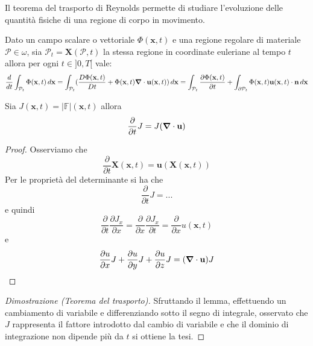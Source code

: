 Il teorema del trasporto di Reynolds permette di studiare l'evoluzione delle quantità fisiche di una regione di corpo in movimento.

\begin{theorem}
Dato un campo scalare o vettoriale $\Phi(\mathbf{x},t)$ e una regione regolare di materiale $\mathcal{P}\in\omega$, sia $\mathcal{P}_{t} = \mathbf{X}(\mathcal{P},t)$ la stessa regione in coordinate euleriane al tempo $t$ allora per ogni $t\in ]0,T[$ vale:
\begin{equation}
\frac{d}{dt}\int_{\mathcal{P}_{t}}\Phi(\mathbf{x},t)\,d\mathbf{x} = \int_{\mathcal{P}_{t}}(\frac{D\Phi(\mathbf{x},t)}{Dt}+\Phi(\mathbf{x},t)\boldsymbol{\nabla}\cdot\mathbf{u}(\mathbf{x},t))\,d\mathbf{x}
= \int_{\mathcal{P}_{t}}\frac{\partial\Phi(\mathbf{x},t)}{\partial t}+ \int_{\partial\mathcal{P}_{t}}\Phi(\mathbf{x},t)\mathbf{u}(\mathbf{x},t)\cdot\mathbf{n}\,d\mathbf{x}
\end{equation}
\end{theorem}
\begin{lemma}
Sia $J(\mathbf{x},t)=|\mathbb{F}|(\mathbf{x},t)$ allora
\begin{equation}
\frac{\partial}{\partial t}J = J (\boldsymbol{\nabla} \cdot \mathbf{u} )
\end{equation}
\end{lemma}
\begin{proof}
Osserviamo che 
\begin{equation}
\frac{\partial}{\partial t}\mathbf{X}(\mathbf{x},t) = \mathbf{u}(\mathbf{X}(\mathbf{x},t))
\end{equation}
Per le proprietà del determinante si ha che
\begin{equation}
\frac{\partial}{\partial t}J = ...
\end{equation}
e quindi
\begin{equation}
\frac{\partial}{\partial t}\frac{\partial J_x}{\partial x} =
\frac{\partial}{\partial x}\frac{\partial J_x}{\partial t} = 
\frac{\partial}{\partial x}u(\mathbf{x},t)
\end{equation}
e 
\begin{equation}
\frac{\partial u}{\partial x} J + \frac{\partial u}{\partial y} J +\frac{\partial u}{\partial z} J = (\boldsymbol{\nabla} \cdot \mathbf{u}) J
\end{equation}
\end{proof}
\begin{proof}[Dimostrazione (Teorema del trasporto)]
Sfruttando il lemma, effettuendo un cambiamento di variabile e differenziando sotto il segno di integrale, osservato che $J$ rappresenta il fattore introdotto dal cambio di variabile e che il dominio di integrazione non dipende più da $t$ si ottiene la tesi.
\end{proof}

